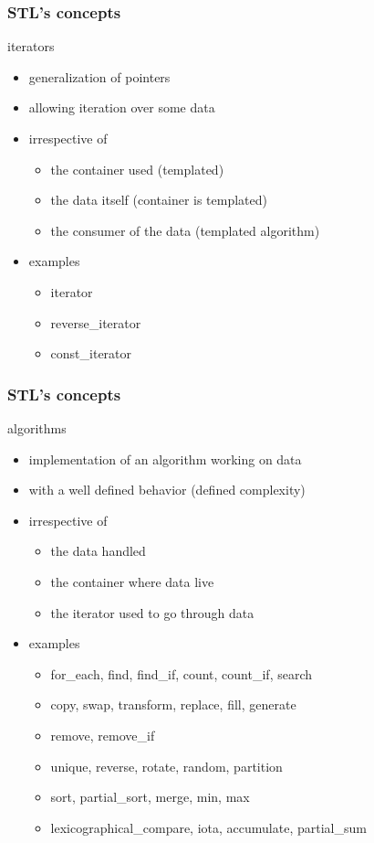 \begin{frame}[fragile]
  \frametitle{STL's concepts}
  \begin{block}{iterators}
    \begin{itemize}
    \item generalization of pointers
    \item allowing iteration over some data
    \item irrespective of
      \begin{itemize}
      \item the container used (templated)
      \item the data itself (container is templated)
      \item the consumer of the data (templated algorithm)
      \end{itemize}
    \item examples
      \begin{itemize}
      \item iterator
      \item reverse\_iterator
      \item const\_iterator
      \end{itemize}
    \end{itemize}
  \end{block}
\end{frame}

\begin{frame}[fragile]
  \frametitle{STL's concepts}
  \begin{block}{algorithms}
    \begin{itemize}
    \item implementation of an algorithm working on data
    \item with a well defined behavior (defined complexity)
    \item irrespective of
      \begin{itemize}
      \item the data handled
      \item the container where data live
      \item the iterator used to go through data
      \end{itemize}
    \item examples
      \begin{itemize}
      \item for\_each, find, find\_if, count, count\_if, search
      \item copy, swap, transform, replace, fill, generate
      \item remove, remove\_if
      \item unique, reverse, rotate, random, partition
      \item sort, partial\_sort, merge, min, max
      \item lexicographical\_compare, iota, accumulate, partial\_sum
      \end{itemize}
    \end{itemize}
  \end{block}
\end{frame}
      
